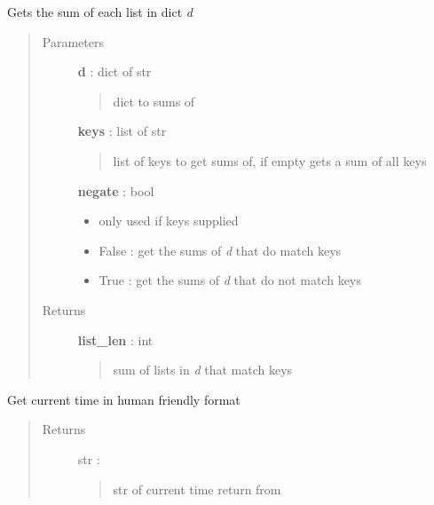 \documentclass[letterpaper,10pt,english]{sphinxmanual}
\begin{document}
\begin{fulllineitems}
\label{pytan.utils:pytan.utils.get_dict_list_len}
Gets the sum of each list in dict \emph{d}
\begin{quote}\begin{description}
\item[{Parameters}] \leavevmode
\textbf{d} : dict of str
\begin{quote}

dict to sums of
\end{quote}

\textbf{keys} : list of str
\begin{quote}

list of keys to get sums of, if empty gets a sum of all keys
\end{quote}

\textbf{negate} : bool
\begin{itemize}
\item {} 
only used if keys supplied

\item {} 
False : get the sums of \emph{d} that do match keys

\item {} 
True : get the sums of \emph{d} that do not match keys

\end{itemize}

\item[{Returns}] \leavevmode
\textbf{list\_len} : int
\begin{quote}

sum of lists in \emph{d} that match keys
\end{quote}

\end{description}\end{quote}

\end{fulllineitems}


\begin{fulllineitems}
\label{pytan.utils:pytan.utils.get_now}
Get current time in human friendly format
\begin{quote}\begin{description}
\item[{Returns}] \leavevmode
str :
\begin{quote}

str of current time return from {\hyperref[pytan.utils:pytan.utils.human_time]{}}
\end{quote}

\end{description}\end{quote}

\end{fulllineitems}
\end{document}
